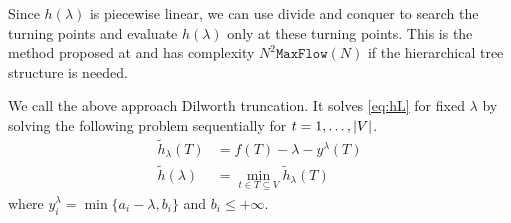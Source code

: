 \documentclass{article}
\begin{document}
Since $h(\lambda)$ is piecewise linear, we can use divide and conquer to search the turning points and evaluate $h(\lambda)$ only at these turning points. This is the method proposed at \cite{RN7} and has complexity $N^2 \mathtt{MaxFlow}(N)$ if the hierarchical tree structure is needed. 

We call the above approach Dilworth truncation. It solves \eqref{eq:hL} for fixed $\lambda$  by solving the following problem sequentially for $t=1,\dots,\lvert V\rvert$.
\begin{align}
\tilde{h}_{\lambda}(T) &= f(T) - \lambda - y^{\lambda}(T)\\
\tilde{h}(\lambda) & = \min_{t \in T \subseteq V} \tilde{h}_{\lambda}(T) \label{eq:pmq}
\end{align}
where
$y^{\lambda}_i = \min\{a_i - \lambda, b_i\}$  and $b_i \leq +\infty$. 
\end{document}
